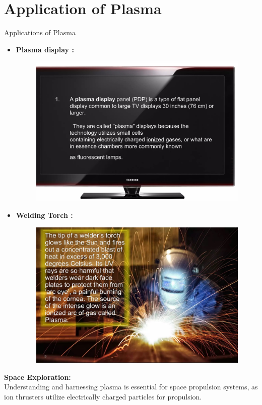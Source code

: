 \documentclass[13pt]{beamer}
\begin{document}
\section{Application of Plasma}
\begin{frame}[t,allowframebreaks]{Applications of Plasma}
\begin{itemize}
		\item  \textbf{Plasma display : }
		\begin{figure}
			\href{https://github.com/saurabhsg99/Plasma-ppt/blob/main/Images/apps(1).jpg?raw=true}{
			\includegraphics[height= 0.5\textwidth]{Images/apps (1).jpg}}
		\end{figure}


		\item  \textbf{Welding Torch : }
		\begin{figure}
			\centering
			\href{https://github.com/saurabhsg99/Plasma-ppt/blob/main/Images/apps(3).jpg?raw=true}{
			\includegraphics[height=0.5\textwidth]{Images/apps (3).jpg}}
		\end{figure}

\end{itemize}


	 \textbf{Space Exploration:} \\
		Understanding and harnessing plasma is essential for space propulsion systems, as ion thrusters utilize electrically charged particles for propulsion.
		\begin{figure}
			\centering


\end{figure}
\end{frame}
\end{document}
